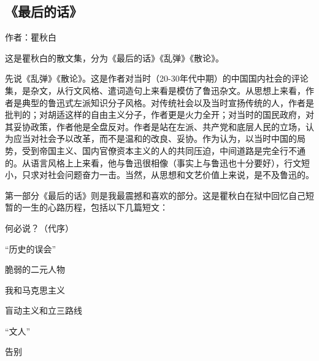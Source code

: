 \subsection{《最后的话》}

作者：瞿秋白

这是瞿秋白的散文集，分为《最后的话》《乱弹》《散论》。

先说《乱弹》《散论》。这是作者对当时（20-30年代中期）的中国国内社会的评论集，是杂文，从行文风格、遣词造句上来看是模仿了鲁迅杂文。从思想上来看，作者是典型的鲁迅式左派知识分子风格。对传统社会以及当时宣扬传统的人，作者是批判的；对胡适这样的自由主义分子，作者更是火力全开；对当时的国民政府，对其妥协政策，作者他是全盘反对。作者是站在左派、共产党和底层人民的立场，认为应当对社会予以改革，而不是温和的改良、妥协。作为认为，以当时中国的局势，受到帝国主义、国内官僚资本主义的人的共同压迫，中间道路是完全行不通的。从语言风格上上来看，他与鲁迅很相像（事实上与鲁迅也十分要好），行文短小，只求对社会问题奋力一击。当然，从思想和文艺价值上来说，是不及鲁迅的。

第一部分《最后的话》则是我最震撼和喜欢的部分。这是瞿秋白在狱中回忆自己短暂的一生的心路历程，包括以下几篇短文：
\begin{itemize*}
    \item 何必说？（代序）
    \item “历史的误会”
    \item 脆弱的二元人物
    \item 我和马克思主义
    \item 盲动主义和立三路线
    \item “文人”
    \item 告别
\end{itemize*}


